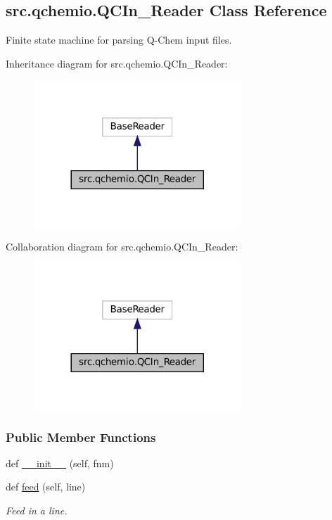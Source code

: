 \hypertarget{classsrc_1_1qchemio_1_1QCIn__Reader}{}\subsection{src.\+qchemio.\+Q\+C\+In\+\_\+\+Reader Class Reference}
\label{classsrc_1_1qchemio_1_1QCIn__Reader}


Finite state machine for parsing Q-\/\+Chem input files.  




Inheritance diagram for src.\+qchemio.\+Q\+C\+In\+\_\+\+Reader\+:
\nopagebreak
\begin{figure}[H]
\begin{center}
\leavevmode
\includegraphics[width=221pt]{classsrc_1_1qchemio_1_1QCIn__Reader__inherit__graph}
\end{center}
\end{figure}


Collaboration diagram for src.\+qchemio.\+Q\+C\+In\+\_\+\+Reader\+:
\nopagebreak
\begin{figure}[H]
\begin{center}
\leavevmode
\includegraphics[width=221pt]{classsrc_1_1qchemio_1_1QCIn__Reader__coll__graph}
\end{center}
\end{figure}
\subsubsection*{Public Member Functions}
\begin{DoxyCompactItemize}
\item 
def \hyperlink{classsrc_1_1qchemio_1_1QCIn__Reader_a927758b19f88fe6e3bdef301cb46a74d}{\+\_\+\+\_\+init\+\_\+\+\_\+} (self, fnm)
\item 
def \hyperlink{classsrc_1_1qchemio_1_1QCIn__Reader_a21931c7c857f2497bdf3c4031a464ddf}{feed} (self, line)
\begin{DoxyCompactList}\small\item\em Feed in a line. \end{DoxyCompactList}\end{DoxyCompactItemize}
